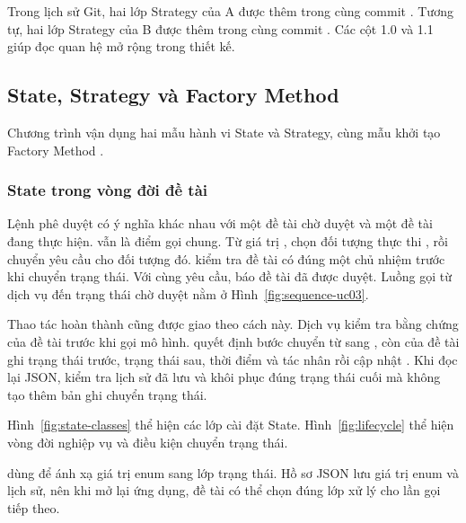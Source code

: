 Trong lịch sử Git, hai lớp Strategy của A được thêm trong cùng commit . Tương tự, hai lớp Strategy của B được thêm trong cùng commit . Các cột 1.0 và 1.1 giúp đọc quan hệ mở rộng trong thiết kế.

\subsection{State, Strategy và Factory Method}\label{sec:patterns}

Chương trình vận dụng hai mẫu hành vi State và Strategy, cùng mẫu khởi tạo Factory Method .

\subsubsection{State trong vòng đời đề tài}\label{sec:pattern-state}

Lệnh phê duyệt có ý nghĩa khác nhau với một đề tài chờ duyệt và một đề tài đang thực hiện.  vẫn là điểm gọi chung. Từ giá trị ,  chọn đối tượng thực thi , rồi  chuyển yêu cầu cho đối tượng đó.  kiểm tra đề tài có đúng một chủ nhiệm trước khi chuyển trạng thái. Với cùng yêu cầu,  báo đề tài đã được duyệt. Luồng gọi từ dịch vụ đến trạng thái chờ duyệt nằm ở Hình~\ref{fig:sequence-uc03}.

Thao tác hoàn thành cũng được giao theo cách này. Dịch vụ kiểm tra bằng chứng của đề tài trước khi gọi mô hình.  quyết định bước chuyển từ  sang , còn  của đề tài ghi trạng thái trước, trạng thái sau, thời điểm và tác nhân rồi cập nhật . Khi đọc lại JSON,  kiểm tra lịch sử đã lưu và khôi phục đúng trạng thái cuối mà không tạo thêm bản ghi chuyển trạng thái.

Hình~\ref{fig:state-classes} thể hiện các lớp cài đặt State. Hình~\ref{fig:lifecycle} thể hiện vòng đời nghiệp vụ và điều kiện chuyển trạng thái.
\clearpage
\begin{ReportFigureHere}
  \caption{Vòng đời đề tài nghiên cứu}\label{fig:lifecycle}
\end{ReportFigureHere}

 dùng  để ánh xạ giá trị enum sang lớp trạng thái. Hồ sơ JSON lưu giá trị enum và lịch sử, nên khi mở lại ứng dụng, đề tài có thể chọn đúng lớp xử lý cho lần gọi tiếp theo.

